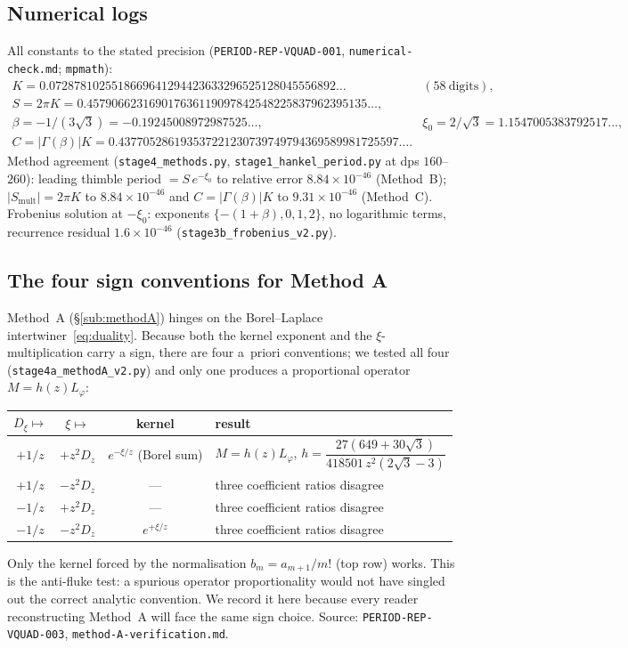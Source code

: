 \documentclass[11pt,reqno]{amsart}
\theoremstyle{plain}
\theoremstyle{definition}
\newcommand{\Lphi}{L_{\varphi}}
\newcommand{\xizero}{\xi_0}
\providecommand{\C}{}\renewcommand{\C}{C}
\begin{document}
\subsection{Numerical logs}\label{app:numlogs}
All constants to the stated precision (\texttt{PERIOD-REP-VQUAD-001},
\texttt{numerical-check.md}; \texttt{mpmath}):
\[
\begin{array}{ll}
  K=0.0728781025518669641294423633296525128045556892\ldots & (58\ \text{digits}),\\
  S=2\pi K=0.457906623169017636119097842548225837962395135\ldots,\\
  \beta=-1/(3\sqrt3)=-0.19245008972987525\ldots, & \xizero=2/\sqrt3=1.1547005383792517\ldots,\\
  \C=\lvert\Gamma(\beta)\rvert K=0.437705286193537221230739749794369589981725597\ldots.
\end{array}
\]
Method agreement (\texttt{stage4\_methods.py}, \texttt{stage1\_hankel\_period.py} at dps
$160$--$260$): leading thimble period $=S\,e^{-\xizero}$ to relative error $8.84\times10^{-46}$
(Method~B); $\lvert S_{\mathrm{mult}}\rvert=2\pi K$ to $8.84\times10^{-46}$ and
$\C=\lvert\Gamma(\beta)\rvert K$ to $9.31\times10^{-46}$ (Method~C). Frobenius solution at
$-\xizero$: exponents $\{-(1+\beta),0,1,2\}$, no logarithmic terms, recurrence residual
$1.6\times10^{-46}$ (\texttt{stage3b\_frobenius\_v2.py}).

\subsection{The four sign conventions for Method A}\label{app:conventions}
Method~A (\S\ref{sub:methodA}) hinges on the Borel--Laplace intertwiner~\eqref{eq:duality}. Because
both the kernel exponent and the $\xi$-multiplication carry a sign, there are four a~priori
conventions; we tested all four (\texttt{stage4a\_methodA\_v2.py}) and only one produces a
proportional operator $M=h(z)\Lphi$:
\begin{center}
\begin{tabular}{@{}cccl@{}}
\hline
$D_\xi\mapsto$ & $\xi\mapsto$ & kernel & result \\
\hline
$+1/z$ & $+z^2D_z$ & $e^{-\xi/z}$ (Borel sum) & $M=h(z)\Lphi$, $h=\dfrac{27(649+30\sqrt3)}{418501\,z^2(2\sqrt3-3)}$ \\
$+1/z$ & $-z^2D_z$ & --- & three coefficient ratios disagree \\
$-1/z$ & $+z^2D_z$ & --- & three coefficient ratios disagree \\
$-1/z$ & $-z^2D_z$ & $e^{+\xi/z}$ & three coefficient ratios disagree \\
\hline
\end{tabular}
\end{center}
Only the kernel forced by the normalisation $b_m=a_{m+1}/m!$ (top row) works. This is the
anti-fluke test: a spurious operator proportionality would not have singled out the correct
analytic convention. We record it here because every reader reconstructing Method~A will face the
same sign choice. Source: \texttt{PERIOD-REP-VQUAD-003}, \texttt{method-A-verification.md}.
\end{document}
